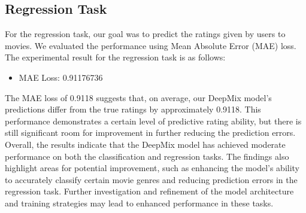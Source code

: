 \documentclass{sigkddExp}
\begin{document}
\subsection{Regression Task}
\vspace{3mm}
For the regression task, our goal was to predict the ratings given by users to movies. We evaluated the performance using Mean Absolute Error (MAE) loss.
\vspace{3mm}\newline
The experimental result for the regression task is as follows:

\begin{itemize}
\item MAE Loss: 0.91176736
\end{itemize}

The MAE loss of 0.9118 suggests that, on average, our DeepMix model's predictions differ from the true ratings by approximately 0.9118. This performance demonstrates a certain level of predictive rating ability, but there is still significant room for improvement in further reducing the prediction errors.
\vspace{3mm}\newline
Overall, the results indicate that the DeepMix model has achieved moderate performance on both the classification and regression tasks. The findings also highlight areas for potential improvement, such as enhancing the model's ability to accurately classify certain movie genres and reducing prediction errors in the regression task. Further investigation and refinement of the model architecture and training strategies may lead to enhanced performance in these tasks.

% 
% 
\end{document}
